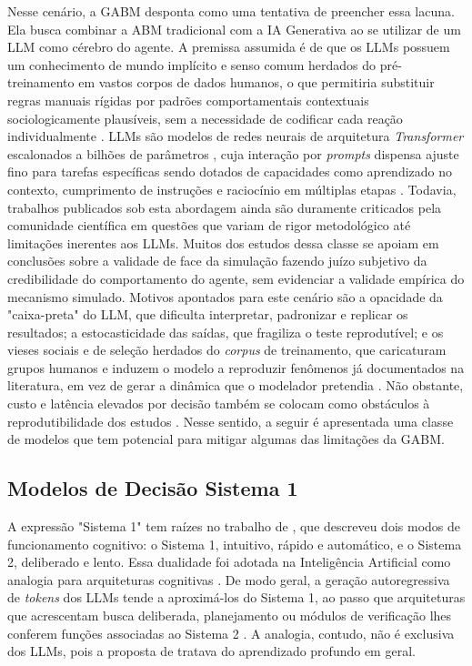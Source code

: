\documentclass[12pt,oneside,a4paper,brazil,sumario=tradicional]{abntex2}
\begin{document}
Nesse cenário, a GABM desponta como uma tentativa de preencher essa lacuna. Ela busca combinar a ABM tradicional com a IA Generativa ao se utilizar de um LLM como cérebro do agente. A premissa assumida é de que os LLMs possuem um conhecimento de mundo implícito e senso comum herdados do pré-treinamento em vastos corpos de dados humanos, o que permitiria substituir regras manuais rígidas por padrões comportamentais contextuais sociologicamente plausíveis, sem a necessidade de codificar cada reação individualmente \parencite{xi2023, wang2023, adornetto2025, ghaffarzadegan2024}. LLMs são modelos de redes neurais de arquitetura \textit{Transformer} escalonados a bilhões de parâmetros \parencite{vaswani2017, zhao2023}, cuja interação por \textit{prompts} dispensa ajuste fino para tarefas específicas sendo dotados de capacidades como aprendizado no contexto, cumprimento de instruções e raciocínio em múltiplas etapas \parencite{wei2022, zhao2023}.
Todavia, trabalhos publicados sob esta abordagem ainda são duramente criticados pela comunidade científica em questões que variam de rigor metodológico até limitações inerentes aos LLMs. Muitos dos estudos dessa classe se apoiam em conclusões sobre a validade de face da simulação fazendo juízo subjetivo da credibilidade do comportamento do agente, sem evidenciar a validade empírica do mecanismo simulado. Motivos apontados para este cenário são a opacidade da "caixa-preta" do LLM, que dificulta interpretar, padronizar e replicar os resultados; a estocasticidade das saídas, que fragiliza o teste reprodutível; e os vieses sociais e de seleção herdados do \textit{corpus} de treinamento, que caricaturam grupos humanos e induzem o modelo a reproduzir fenômenos já documentados na literatura, em vez de gerar a dinâmica que o modelador pretendia \parencite{larooij2025,taillandier2026}. Não obstante, custo e latência elevados por decisão também se colocam como obstáculos à reprodutibilidade dos estudos \parencite{chen2023}. Nesse sentido, a seguir é apresentada uma classe de modelos que tem potencial para mitigar algumas das limitações da GABM.

\subsection{Modelos de Decisão Sistema 1}

A expressão "Sistema 1" tem raízes no trabalho de \textcite{kahneman2003}, que descreveu dois modos de funcionamento cognitivo: o Sistema 1, intuitivo, rápido e automático, e o Sistema 2, deliberado e lento. Essa dualidade foi adotada na Inteligência Artificial como analogia para arquiteturas cognitivas \parencite{bengio2019, booch2021, goyal2022}. De modo geral, a geração autoregressiva de \textit{tokens} dos LLMs tende a aproximá-los do Sistema 1, ao passo que arquiteturas que acrescentam busca deliberada, planejamento ou módulos de verificação lhes conferem funções associadas ao Sistema 2 \parencite{booch2021, kambhampati2024, yao2023, sumers2024}. A analogia, contudo, não é exclusiva dos LLMs, pois a proposta de \textcite{bengio2019} tratava do aprendizado profundo em geral.
\end{document}
